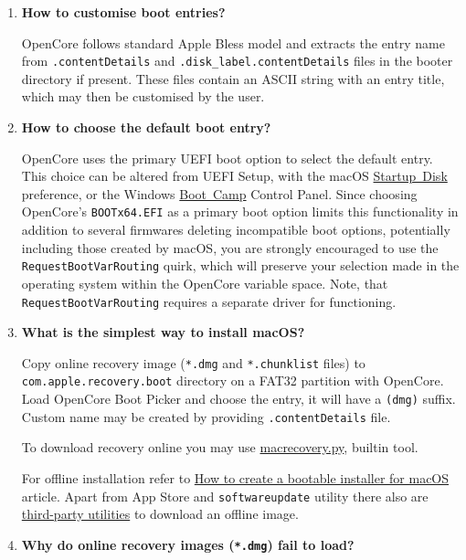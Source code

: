 \documentclass[]{article}
\begin{document}
\begin{enumerate}
\item
  \textbf{How to customise boot entries?}

  OpenCore follows standard Apple Bless model and extracts the entry name
  from \texttt{.contentDetails} and \texttt{.disk\_label.contentDetails} files in the
  booter directory if present. These files contain an ASCII string with an entry title,
  which may then be customised by the user.

\item
  \textbf{How to choose the default boot entry?}

  OpenCore uses the primary UEFI boot option to select the default entry. This choice
  can be altered from UEFI Setup, with the macOS
  \href{https://support.apple.com/HT202796}{Startup Disk} preference, or the Windows
  \href{https://support.apple.com/guide/bootcamp-control-panel/start-up-your-mac-in-windows-or-macos-bcmp29b8ac66/mac}{Boot Camp} Control Panel.
  Since choosing OpenCore's \texttt{BOOTx64.EFI} as a primary boot option limits this
  functionality in addition to several firmwares deleting incompatible boot options,
  potentially including those created by macOS, you are strongly encouraged to use the
  \texttt{RequestBootVarRouting} quirk, which will preserve your selection made in
  the operating system within the OpenCore variable space. Note, that \texttt{RequestBootVarRouting}
  requires a separate driver for functioning.

\item
  \textbf{What is the simplest way to install macOS?}

  Copy online recovery image (\texttt{*.dmg} and \texttt{*.chunklist} files)
  to \texttt{com.apple.recovery.boot} directory on a FAT32 partition with OpenCore.
  Load OpenCore Boot Picker and choose the entry, it will have a \texttt{(dmg)} suffix.
  Custom name may be created by providing \texttt{.contentDetails} file.

  To download recovery online you may use
  \href{https://github.com/acidanthera/OpenCorePkg/blob/master/Utilities/macrecovery/macrecovery.py}{macrecovery.py},
  builtin tool.

  For offline installation refer to
  \href{https://support.apple.com/HT201372}{How to create a bootable installer for macOS}
  article. Apart from App Store and \texttt{softwareupdate} utility there also are
  \href{https://github.com/corpnewt/gibMacOS}{third-party utilities} to download an offline image.

\item
  \textbf{Why do online recovery images (\texttt{*.dmg}) fail to load?}


\end{enumerate}
\end{document}
